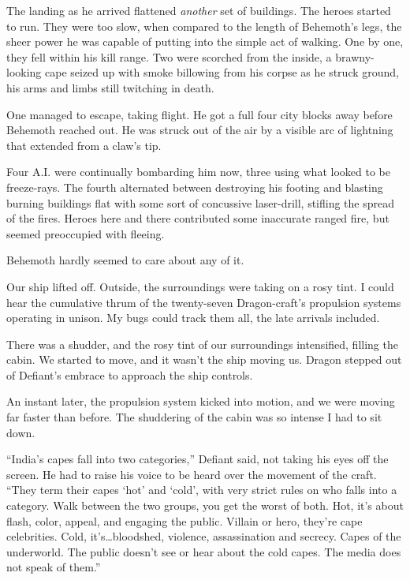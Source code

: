 The landing as he arrived flattened \emph{another} set of buildings.  The heroes started to run.  They were too slow, when compared to the length of Behemoth's legs, the sheer power he was capable of putting into the simple act of walking.  One by one, they fell within his kill range.  Two were scorched from the inside, a brawny-looking cape seized up with smoke billowing from his corpse as he struck ground, his arms and limbs still twitching in death.



One managed to escape, taking flight.  He got a full four city blocks away before Behemoth reached out.  He was struck out of the air by a visible arc of lightning that extended from a claw's tip.



Four A.I. were continually bombarding him now, three using what looked to be freeze-rays.  The fourth alternated between destroying his footing and blasting burning buildings flat with some sort of concussive laser-drill, stifling the spread of the fires.  Heroes here and there contributed some inaccurate ranged fire, but seemed preoccupied with fleeing.



Behemoth hardly seemed to care about any of it.



Our ship lifted off.  Outside, the surroundings were taking on a rosy tint.  I could hear the cumulative thrum of the twenty-seven Dragon-craft's propulsion systems operating in unison.  My bugs could track them all, the late arrivals included.



There was a shudder, and the rosy tint of our surroundings intensified, filling the cabin.  We started to move, and it wasn't the ship moving us.  Dragon stepped out of Defiant's embrace to approach the ship controls.



An instant later, the propulsion system kicked into motion, and we were moving far faster than before.  The shuddering of the cabin was so intense I had to sit down.



``India's capes fall into two categories,'' Defiant said, not taking his eyes off the screen.  He had to raise his voice to be heard over the movement of the craft.  ``They term their capes `hot' and `cold', with very strict rules on who falls into a category.  Walk between the two groups, you get the worst of both.  Hot, it's about flash, color, appeal, and engaging the public.  Villain or hero, they're cape celebrities.  Cold, it's\ldots bloodshed, violence, assassination and secrecy.  Capes of the underworld.  The public doesn't see or hear about the cold capes.  The media does not speak of them.''



